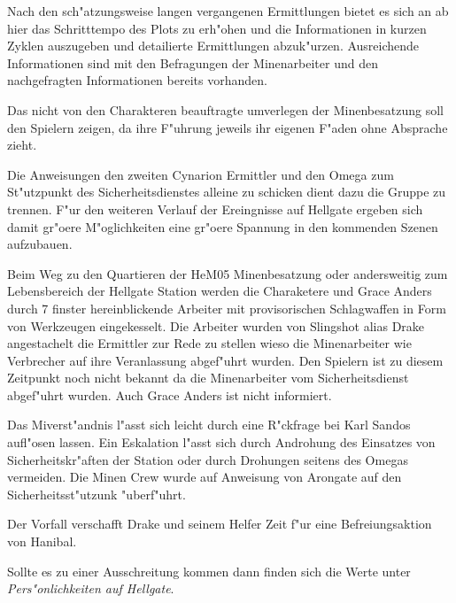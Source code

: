 \begin{remarks}
	Nach den sch"atzungsweise langen vergangenen Ermittlungen bietet es sich an ab hier das Schritttempo des Plots zu erh"ohen und die Informationen in kurzen Zyklen auszugeben und detailierte Ermittlungen abzuk"urzen. Ausreichende Informationen sind mit den Befragungen der Minenarbeiter und den nachgefragten Informationen bereits vorhanden.

	Das nicht von den Charakteren beauftragte umverlegen der Minenbesatzung soll den Spielern zeigen, da\3 ihre F"uhrung jeweils ihr eigenen F"aden ohne Absprache zieht.

	Die Anweisungen den zweiten Cynarion Ermittler und den Omega zum St"utzpunkt des Sicherheitsdienstes alleine zu schicken dient dazu die Gruppe zu trennen. F"ur den weiteren Verlauf der Ereingnisse auf Hellgate ergeben sich damit gr"o\3ere M"oglichkeiten eine gr"o\3ere Spannung in den kommenden Szenen aufzubauen.
\end{remarks}


Beim Weg zu den Quartieren der HeM05 Minenbesatzung oder andersweitig zum Lebensbereich der Hellgate Station werden die Charaketere und Grace Anders durch 7 finster hereinblickende Arbeiter mit provisorischen Schlagwaffen in Form von Werkzeugen eingekesselt. Die Arbeiter wurden von Slingshot alias Drake angestachelt die Ermittler zur Rede zu stellen wieso die Minenarbeiter wie Verbrecher auf ihre Veranlassung abgef"uhrt wurden. Den Spielern ist zu diesem Zeitpunkt noch nicht bekannt da\3 die Minenarbeiter vom Sicherheitsdienst abgef"uhrt wurden. Auch Grace Anders ist nicht informiert.

\begin{remarks}
	Das Mi\3verst"andnis l"asst sich leicht durch eine R"ckfrage bei Karl Sandos aufl"osen lassen. Ein Eskalation l"asst sich durch Androhung des Einsatzes von Sicherheitskr"aften der Station oder durch Drohungen seitens des Omegas vermeiden. Die Minen Crew wurde auf Anweisung von Arongate auf den Sicherheitsst"utzunk "uberf"uhrt.
	
	Der Vorfall verschafft Drake und seinem Helfer Zeit f"ur eine Befreiungsaktion von Hanibal.

	Sollte es zu einer Ausschreitung kommen dann finden sich die Werte unter \emph{Pers"onlichkeiten auf Hellgate}.
\end{remarks}


